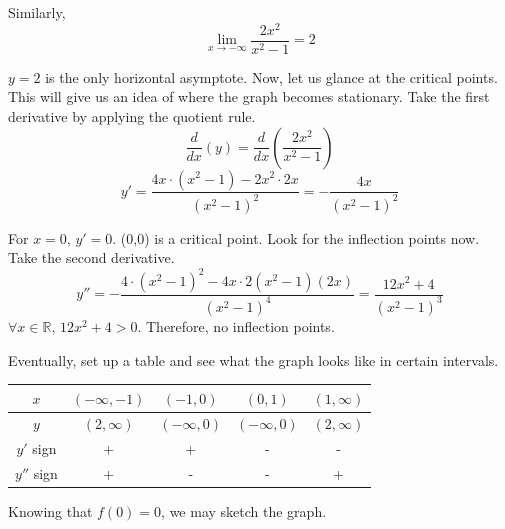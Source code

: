 \documentclass[a4paper, 12pt]{article}
\begin{document}
\begin{enumerate}[leftmargin=*,label=\textbf{\arabic*.}]
Similarly,
\[\lim_{x\to -\infty} \frac{2x^2}{x^2-1} = 2\]

$y=2$ is the only horizontal asymptote. Now, let us glance at the critical points. This will give us an idea of where the graph becomes stationary. Take the first derivative by applying the quotient rule.
\[\frac{d}{dx}(y)=\frac{d}{dx}\left(\frac{2x^2}{x^2-1}\right)\]
\[y'=\frac{4x\cdot(x^2-1)-2x^2\cdot 2x}{\left(x^2-1\right)^2}=-\frac{4x}{\left(x^2-1\right)^2} \]

For $x=0$, $y'=0$. (0,0) is a critical point. Look for the inflection points now. Take the second derivative.
\[y''=-\frac{4\cdot\left(x^2-1\right)^2-4x\cdot2\left(x^2-1\right)(2x)}{\left(x^2-1\right)^4}=\frac{12x^2+4}{\left(x^2-1\right)^3}\]
$\forall x \in \mathbb{R},\,12x^2+4 > 0$. Therefore, no inflection points.

Eventually, set up a table and see what the graph looks like in certain intervals.
\begin{center}
    \large
    \begin{tabular}{ |c| c c c c| } 
    \hline
        $x$ & $(-\infty, -1)$ & $(-1, 0)$ & $(0, 1)$ &  $(1, \infty)$ \\
        \hline
        $y$ & $(2, \infty)$ & $(-\infty, 0)$ & $(-\infty, 0)$ & $(2, \infty)$\\
        \hline
        $y'$ sign & + & + & - & - \\
        \hline
        $y''$ sign & + & - & - & + \\
        \hline
    \end{tabular}
\end{center}

Knowing that $f(0)=0$, we may sketch the graph.
\begin{center}
\end{center}


\end{enumerate}
\end{document}
